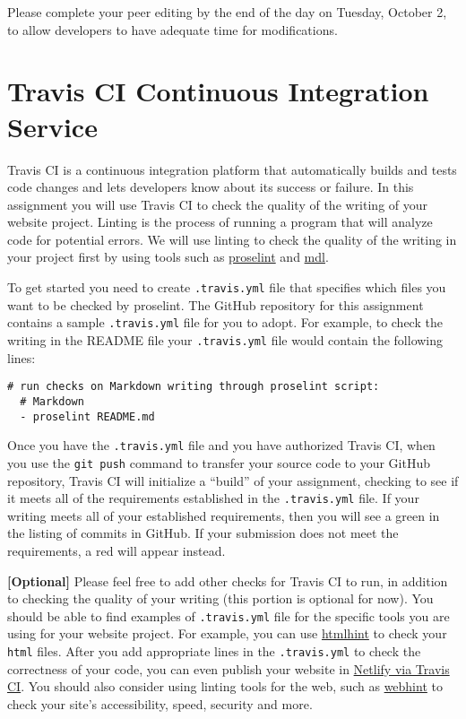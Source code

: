 \documentclass[11pt]{article}
\newcommand{\step}[1]{``{#1}''}
\newcommand{\checkmark}{\ding{51}}
\newcommand{\naughtmark}{\ding{55}}
\begin{document}
Please complete your peer editing by the end of the day on Tuesday, October 2, to allow developers to have adequate time for modifications. 

\section*{Travis CI Continuous Integration Service}

Travis CI is a continuous integration platform that automatically builds and tests code changes and lets developers know about its success or failure. In this assignment you will use Travis CI to check the quality of the writing of your website project. Linting is the process of running a program that will analyze code for potential errors. We will use linting to check the quality of the writing in your project first by using tools such as \href{https://github.com/amperser/proselint}{proselint} and \href{https://github.com/markdownlint/markdownlint}{mdl}. 

To get started you need to create {\tt .travis.yml} file that specifies which files you want to be checked by proselint. The GitHub repository for this assignment contains a sample {\tt .travis.yml} file for you to adopt. For example, to check the writing in the README file your {\tt .travis.yml} file would contain the following lines:
\begin{verbatim}
# run checks on Markdown writing through proselint script:
  # Markdown
  - proselint README.md
\end{verbatim}

Once you have the {\tt .travis.yml} file and you have authorized Travis CI, when you use the
{\tt git push} command to transfer your source code to your GitHub repository, Travis CI will initialize a \step{build} of
your assignment, checking to see if it meets all of the requirements established in the {\tt .travis.yml} file. If your  writing meets all of
your established requirements, then you will see a green \checkmark{} in the listing of commits in GitHub. If your submission does not meet the requirements, a red \naughtmark{} will appear instead.

\noindent \textbf{[Optional]} Please feel free to add other checks for Travis CI to run, in addition to checking the quality of your writing (this portion is optional for now). You should be able to find examples of {\tt .travis.yml} file for the specific tools you are using for your website project. For example, you can use \href{https://www.npmjs.com/package/htmlhint}{htmlhint} to check your {\tt html} files. After you add appropriate lines in the {\tt .travis.yml} to check the correctness of your code, you can even publish your website in \href{https://www.laroberto.com/publishing-in-netlify-via-travisci/}{Netlify via Travis CI}. You should also consider using linting tools for the web, such as \href{https://webhint.io/}{webhint} to check your site's accessibility, speed, security and more.
\end{document}
